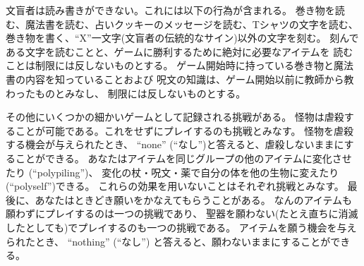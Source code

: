 文盲者は読み書きができない。これには以下の行為が含まれる。
巻き物を読む、魔法書を読む、占いクッキーのメッセージを読む、Tシャツの文字を読む、
巻き物を書く、``X''一文字(文盲者の伝統的なサイン)以外の文字を刻む。
刻んである文字を読むことと、ゲームに勝利するために絶対に必要なアイテムを
読むことは制限には反しないものとする。
ゲーム開始時に持っている巻き物と魔法書の内容を知っていることおよび
呪文の知識は、ゲーム開始以前に教師から教わったものとみなし、
制限には反しないものとする。

その他にいくつかの細かいゲームとして記録される挑戦がある。
怪物は虐殺することが可能である。これをせずにプレイするのも挑戦とみなす。
怪物を虐殺する機会が与えられたとき、
``none'' (``なし'')と答えると、虐殺しないままにすることができる。
あなたはアイテムを同じグループの他のアイテムに変化させたり (``polypiling'')、
変化の杖・呪文・薬で自分の体を他の生物に変えたり(``polyself'')できる。
これらの効果を用いないことはそれぞれ挑戦とみなす。
最後に、あなたはときどき願いをかなえてもらうことがある。
なんのアイテムも願わずにプレイするのは一つの挑戦であり、
聖器を願わない(たとえ直ちに消滅したとしても)でプレイするのも一つの挑戦である。
アイテムを願う機会を与えられたとき、
``nothing'' (``なし'') と答えると、願わないままにすることができる。

